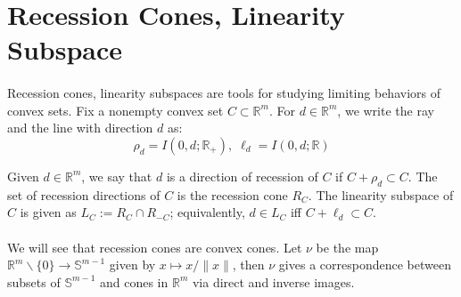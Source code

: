 \section{Recession Cones, Linearity Subspace}
\label{sect:013}

\paragraph{}Recession cones, linearity subspaces are tools for studying limiting behaviors of convex sets. Fix a nonempty convex set $C\subset \mathbb{R}^m$. For $d\in \mathbb{R}^m$, we write the ray and the line with direction $d$ as:
\[
	\rho_d=I(0,d;\mathbb{R}_{+}),\;\ell_d=I(0,d;\mathbb{R})
\]

\begin{defn}
	\label{defn:013-recessioncone}
	Given $d\in \mathbb{R}^m$, we say that $d$ is a direction of recession of $C$ if $C+\rho_d\subset C$.	The set of recession directions of $C$ is the recession cone $R_C$. The linearity subspace of $C$ is given as $L_C:=R_C\cap R_{-C}$; equivalently, $d\in L_C$ iff $C+\ell_d\subset C$.
\end{defn}

\paragraph{}We will see that recession cones are convex cones. Let $\nu$ be the map $\mathbb{R}^m\smallsetminus\{0\}\to \mathbb{S}^{m-1}$ given by $x\mapsto x/\|x\|$, then $\nu$ gives a correspondence between subsets of $\mathbb{S}^{m-1}$ and cones in $\mathbb{R}^m$ via direct and inverse images.

